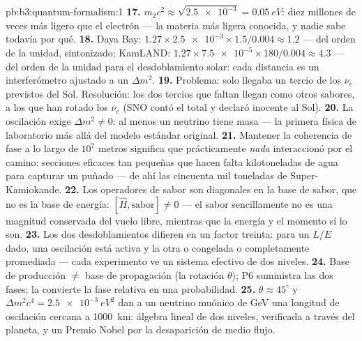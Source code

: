 \begin{solution}{pb:b3:quantum-formalism:1}
\textbf{17.} $m_2c^2 \approx \sqrt{\num{2.5e-3}} = \qty{0.05}{eV}$:
diez millones de veces más ligero que el electrón --- la materia más ligera
conocida, y nadie sabe todavía por qué.
\textbf{18.} Daya Bay: $1.27 \times \num{2.5e-3} \times 1.5/0.004
\approx 1.2$ --- del orden de la unidad, sintonizado; KamLAND: $1.27 \times
\num{7.5e-5} \times 180/0.004 \approx 4.3$ --- del orden de la unidad para
el desdoblamiento solar: cada distancia es un interferómetro ajustado a un
$\Delta m^2$.
\textbf{19.} Problema: solo llegaba un tercio de los $\nu_e$ previstos del
Sol. Resolución: los dos tercios que faltan llegan como otros sabores, a
los que han rotado los $\nu_e$ (SNO contó el total y declaró inocente al
Sol).
\textbf{20.} La oscilación exige $\Delta m^2 \neq 0$: al menos un
neutrino tiene masa --- la primera física de laboratorio más allá del modelo
estándar original.
\textbf{21.} Mantener la coherencia de fase a lo largo de $10^7$ metros
significa que prácticamente \emph{nada} interaccionó por el camino:
secciones eficaces tan pequeñas que hacen falta kilotoneladas de agua para
capturar un puñado --- de ahí las cincuenta mil toneladas de
Super-Kamiokande.
\textbf{22.} Los operadores de sabor son diagonales en la base de sabor,
que no es la base de energía: $[\hat H, \text{sabor}] \neq 0$ ---
el sabor sencillamente no es una magnitud conservada del vuelo libre,
mientras que la energía y el momento sí lo son.
\textbf{23.} Los dos desdoblamientos difieren en un factor treinta: para un
$L/E$ dado, una oscilación está activa y la otra o congelada o
completamente promediada --- cada experimento ve un sistema efectivo de dos
niveles.
\textbf{24.} Base de producción $\neq$ base de propagación (la
rotación $\theta$); P6 suministra las dos fases; la  convierte
la fase relativa en una probabilidad.
\textbf{25.} $\theta \approx 45^\circ$ y $\Delta m^2c^4 =
\qty{2.5e-3}{eV^2}$ dan a un neutrino muónico de GeV una longitud de
oscilación cercana a \qty{1000}{km}: álgebra lineal de dos niveles,
verificada a través del planeta, y un Premio Nobel por la desaparición de
medio flujo.
\end{solution}
